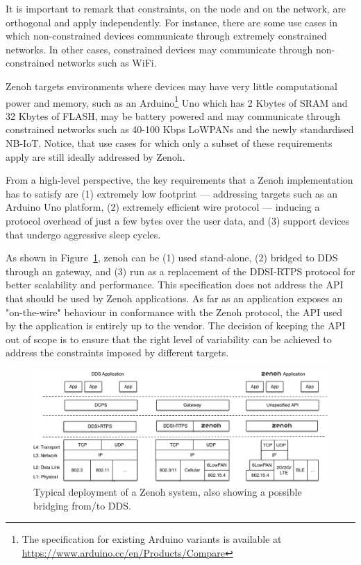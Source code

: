 \documentclass[a4paper,oneside,article]{memoir}
\begin{document}
It is important to remark that constraints, on the node and on the network, are orthogonal and apply independently.  For instance, there are some use cases in which non-constrained devices communicate through extremely constrained networks.  In other cases, constrained devices may communicate through non-constrained networks such as WiFi.

Zenoh targets environments where devices may have very little computational power and memory, such as an Arduino\footnote{The specification for existing Arduino variants is available at \url{https://www.arduino.cc/en/Products/Compare}} Uno which has 2 Kbytes of SRAM and 32 Kbytes of FLASH, may be battery powered and may communicate through constrained networks such as 40-100 Kbps LoWPANs and the newly standardised NB-IoT\@.  Notice, that use cases for which only a subset of these requirements apply are still ideally addressed by Zenoh.

From a high-level perspective, the key requirements that a Zenoh implementation has to satisfy are (1) extremely low footprint --- addressing targets such as an Arduino Uno platform, (2) extremely efficient wire protocol --- inducing a protocol overhead of just a few bytes over the user data, and (3) support devices that undergo aggressive sleep cycles.

As shown in Figure~\ref{fig:zenoh-dds-stack-compare}, zenoh can be (1) used stand-alone, (2) bridged to DDS through an gateway, and (3) run as a replacement of the DDSI-RTPS protocol for better scalability and performance.  This specification does not address the API that should be used by Zenoh applications.  As far as an application exposes an "on-the-wire" behaviour in conformance with the Zenoh protocol, the API used by the application is entirely up to the vendor.  The decision of keeping the API out of scope is to ensure that the right level of variability can be achieved to address the constraints imposed by different targets.

\begin{figure}
  \centering
  \includegraphics[scale=0.3]{zenoh-dds-stack-compare.png}
  \caption{Typical deployment of a Zenoh system, also showing a possible bridging from/to DDS\@.}\label{fig:zenoh-dds-stack-compare}
\end{figure}
\end{document}
